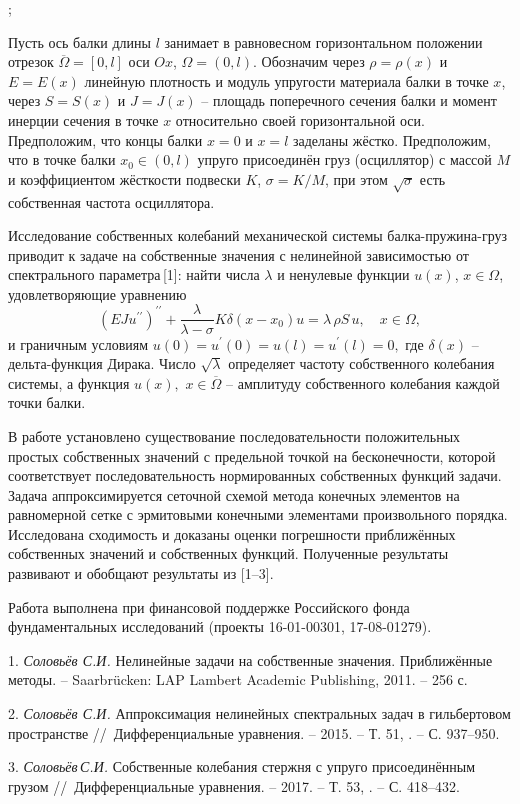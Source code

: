 



; 



Пусть ось балки длины $l$
занимает в равновесном горизонтальном положении отрезок $\overline{\Omega}=[0,l]$
оси $Ox$, $\Omega=(0,l)$. Обозначим через $\rho=\rho(x)$ и $E=E(x)$ линейную плотность и
модуль упругости материала балки в точке $x$,
через $S=S(x)$ и $J=J(x)$ -- площадь поперечного сечения балки и момент
инерции сечения в точке $x$ относительно своей горизонтальной оси.
Предположим, что концы балки $x=0$ и $x=l$ заделаны жёстко.
Предположим,
что в точке балки
$x_0\in(0,l)$ упруго присоединён груз (осциллятор) с массой $M$  и
коэффициентом жёсткости подвески $K$,
$\sigma=K/M$,
при этом
$\sqrt{\sigma}$ есть собственная частота осциллятора.

Исследование собственных колебаний механической системы балка-пружина-груз приводит к
задаче на собственные значения с нелинейной зависимостью от спектрального параметра\,[1]:
найти числа $\lambda$ и ненулевые функции $u(x)$, $x\in\Omega$,
удовлетворяющие уравнению
$$
(EJu^{\prime\prime})^{\prime\prime}+
\frac{\lambda}{\lambda-\sigma}
K\delta(x-x_0)u=
\lambda\,\rho S\,u,\quad
x\in\Omega,
$$
и граничным условиям
$
u(0)=u^{\prime}(0)=u(l)=u^{\prime}(l)=0,
$
где $\delta(x)$ -- дельта-функция Дирака.
Число $\sqrt{\lambda}$ определяет частоту собственного колебания системы, а функция
$u(x),$ $x\in\overline{\Omega}$ -- амплитуду собственного колебания каждой точки балки.

В работе установлено существование последовательности положительных
простых собственных значений с предельной точкой
на бесконечности, которой соответствует последовательность нормированных собственных функций задачи.
Задача аппроксимируется сеточной схемой метода конечных
элементов на равномерной сетке с эрмитовыми конечными элементами произвольного порядка.
Исследована сходимость и доказаны оценки погрешности приближённых
собственных значений и собственных функций.
Полученные результаты развивают и обобщают результаты из [1--3].

Работа выполнена при финансовой поддержке Российского фонда фундаментальных исследований
(проекты 16-01-00301, 17-08-01279).


\litlist

1. {\it Соловьёв С.И.}
Нелинейные задачи на собственные значения. Приближённые методы. --
Saarbr\"ucken: LAP Lambert Academic Publishing, 2011. -- 256 с.

2. {\it Соловьёв С.И.}
Аппроксимация нелинейных спектральных задач в гильбертовом пространстве
//~Дифференциальные уравнения. -- 2015. -- Т. 51,
. -- С. 937--950.

3. {\it Соловьёв\,С.И.}
Собственные колебания стержня с упруго присоединённым грузом
//~Дифференциальные уравнения. -- 2017. -- Т. 53,
. -- С. 418--432.


